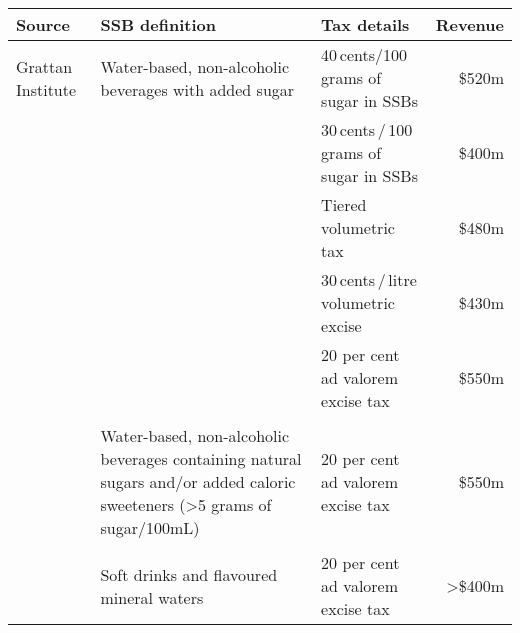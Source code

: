 \bgroup
\def\arraystretch{1.5}
\def\rowSpace{-4pt}
\begin{tabularx}{\columnwidth}{p{2.5cm}X>{\raggedright}p{2.6cm}r}
\toprule
\textbf{Source  } & \textbf{SSB definition} & \textbf{Tax details} & \textbf{Revenue} \\ 
\midrule
Grattan Institute & Water-based, non-alcoholic beverages with added sugar & 40\,cents/100\,grams of sugar in SSBs & \$520m \\
 &  & 30\,cents\,/\,100\,grams of sugar in SSBs        & \$400m \\
 &  & Tiered volumetric tax                & \$480m \\
 &  & 30\,cents\,/\,litre volumetric excise & \$430m \\
 &  & 20 per cent ad valorem excise tax           & \$550m \\
 & & & \\[\rowSpace]
\textcite{Office2016PolicycostingAustralian} & Water-based, non-alcoholic beverages containing natural sugars and/or added caloric sweeteners (\textgreater{}5 grams of sugar/100mL)  & 20 per cent ad valorem excise tax & \$550m \\
& & & \\[\rowSpace]
\textcite{Veerman2016ImpactTaxSugar} & Soft drinks and flavoured mineral waters & 20 per cent ad valorem excise tax& \textgreater{}\$400m \\
\bottomrule
\end{tabularx}
\egroup